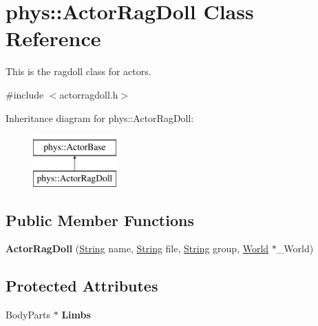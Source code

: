 \hypertarget{classphys_1_1ActorRagDoll}{
\section{phys::ActorRagDoll Class Reference}
\label{d3/d0a/classphys_1_1ActorRagDoll}
}


This is the ragdoll class for actors.  




{\ttfamily \#include $<$actorragdoll.h$>$}

Inheritance diagram for phys::ActorRagDoll:\begin{figure}[H]
\begin{center}
\leavevmode
\includegraphics[height=2cm]{d3/d0a/classphys_1_1ActorRagDoll}
\end{center}
\end{figure}
\subsection*{Public Member Functions}
\begin{DoxyCompactItemize}
\item 
\hypertarget{classphys_1_1ActorRagDoll_a24347ea317712f8d772a913789a4c199}{
{\bfseries ActorRagDoll} (\hyperlink{namespacephys_aa03900411993de7fbfec4789bc1d392e}{String} name, \hyperlink{namespacephys_aa03900411993de7fbfec4789bc1d392e}{String} file, \hyperlink{namespacephys_aa03900411993de7fbfec4789bc1d392e}{String} group, \hyperlink{classphys_1_1World}{World} $\ast$\_\-World)}
\label{d3/d0a/classphys_1_1ActorRagDoll_a24347ea317712f8d772a913789a4c199}

\end{DoxyCompactItemize}
\subsection*{Protected Attributes}
\begin{DoxyCompactItemize}
\item 
\hypertarget{classphys_1_1ActorRagDoll_af11bbe6ee9172490f52d812b4caa0138}{
BodyParts $\ast$ {\bfseries Limbs}}
\label{d3/d0a/classphys_1_1ActorRagDoll_af11bbe6ee9172490f52d812b4caa0138}

\end{DoxyCompactItemize}


